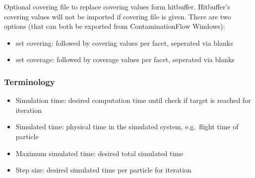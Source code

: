 \bigskip
Optional covering file to replace covering values form hitbuffer. Hitbuffer's covering values will not be imported if covering file is given. There are two options (that can both be exported from ContaminationFlow Windows):
\begin{itemize}[noitemsep,topsep=0pt, partopsep=0pt]
\item  set covering:  followed by covering values per facet, seperated via blanks
\item  set coverage:  followed by coverage values per facet, seperated via blanks
\end{itemize}
%
%

\subsubsection{Terminology}
\begin{itemize}[noitemsep,topsep=0pt, partopsep=0pt]
\item Simulation time: desired computation time until check if target is reached for iteration
\item Simulated time: physical time in the simulated system, e.g.\ flight time of particle
\item Maximum simulated time: desired total simulated time
\item Step size: desired simulated time per particle for iteration
\end{itemize}

